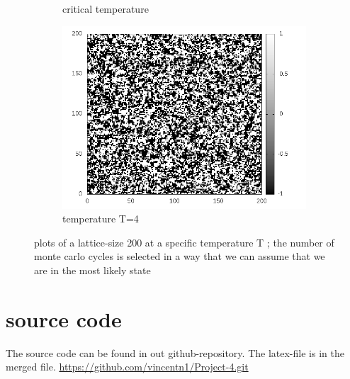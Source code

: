 \documentclass[10pt,a4paper]{article}
\begin{document}
\begin{figure}[h]
\begin{subfigure}{.5\textwidth}
  \caption{critical temperature}
  \label{fig:sfig2}
\end{subfigure}
\begin{subfigure}{.5\textwidth}
  \centering
  \includegraphics[width=.8\linewidth]{spinlatticeT4.png}
  \caption{temperature T=4}
  \label{fig:sfig2}
\end{subfigure}
\caption{plots of a lattice-size 200 at a specific temperature T ; the number of monte carlo cycles is selected in a  way that we can assume that we are in the most likely state }
\label{fig:fig}
\end{figure}
\section{source code}
The source code can  be found in out github-repository. The latex-file is in the merged file.
\url{https://github.com/vincentn1/Project-4.git}
\end{document}
